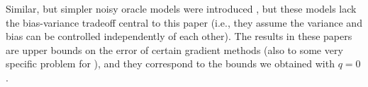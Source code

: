 Similar, but simpler noisy oracle models were introduced \citep{JN11a,Hon12,DvoGa15}, but these models lack the bias-variance tradeoff central to this paper (i.e., they assume the variance and bias can be controlled independently of each other). The results in these papers are upper bounds on the error of certain gradient methods (also to some very specific problem for \cite{Hon12}), and they correspond to the bounds we obtained with $q=0$.



